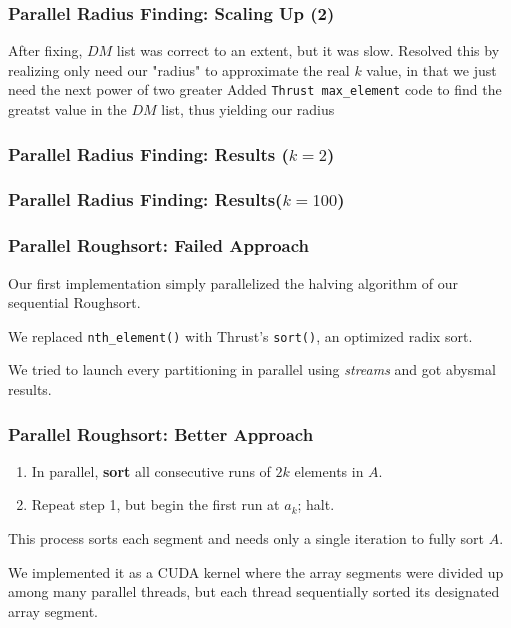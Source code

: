 \documentclass[10pt, xcolor={dvipsnames}, aspectratio=169]{beamer}
\begin{document}
\begin{frame}
	\frametitle{Parallel Radius Finding: Scaling Up (2)}
	After fixing, $DM$ list was correct to an extent, but it was slow.
	\newline\newline
	Resolved this by realizing only need our "radius" to approximate the real $k$ value, in that we just need the next power of two greater
	\newline\newline
	Added \texttt{Thrust max_element} code to find the greatst value in the $DM$ list, thus yielding our radius
\end{frame}

\begin{frame}
\frametitle{Parallel Radius Finding: Results ($k = 2$)}
\begin{figure}
\resizebox{!}{.8\textheight}{}
\end{figure}
\end{frame}

\begin{frame}
\frametitle{Parallel Radius Finding: Results($k = 100$)}
\begin{figure}
	\resizebox{!}{.8\textheight}{}
\end{figure}
\end{frame}

\begin{frame}
\frametitle{Parallel Roughsort: Failed Approach}
Our first implementation simply parallelized the halving algorithm of our sequential Roughsort. \newline

We replaced \texttt{nth_element()} with Thrust's \texttt{sort()}, an optimized radix sort. \newline

We tried to launch every partitioning in parallel using \textit{streams} and got abysmal results.
\end{frame}

\begin{frame}
\frametitle{Parallel Roughsort: Better Approach}
\begin{enumerate}\setlength{\itemsep}{0pt}\setlength{\parskip}{0pt}
\item In parallel, \textbf{sort} all consecutive runs of $2k$ elements in $A$.
\item Repeat step 1, but begin the first run at $a_k$; halt.
\end{enumerate}
This process sorts each segment and needs only a single iteration to fully sort $A$. \newline

We implemented it as a CUDA kernel where the array segments were divided up among many parallel threads,
  but each thread sequentially sorted its designated array segment.
\end{frame}
\end{document}
